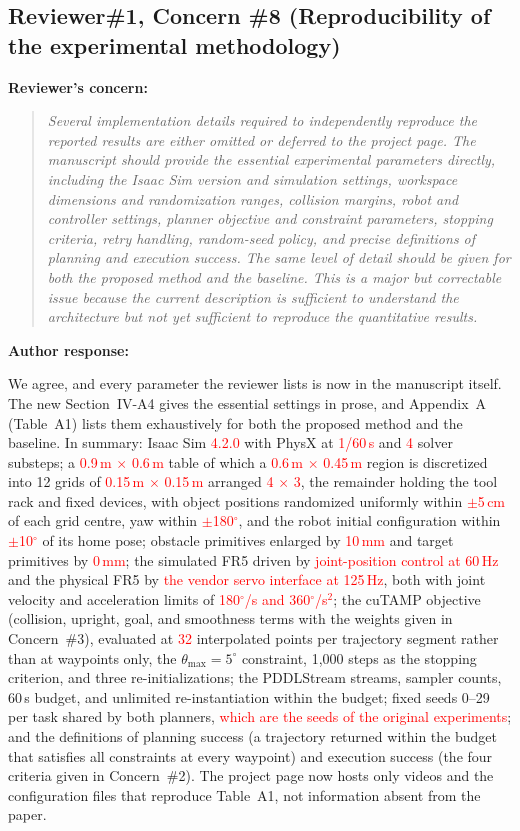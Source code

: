 \documentclass[11pt]{article}
\newcommand{\nd}[1]{\textcolor{red}{#1}}
\newif\ifshowstatus
\newcommand{\statusline}[2]{\ifshowstatus\par\noindent\textcolor{status#1}{\textbf{Status: \MakeUppercase{#1}.} #2}\par\smallskip\fi}
\newenvironment{concern}[3][pending]{\subsection*{\ifshowstatus\textcolor{status#1}{#2}\else#2\fi}\statusline{#1}{#3}\textbf{Reviewer's concern:}\begin{quote}\itshape}{\end{quote}}
\newenvironment{response}{\textbf{Author response:}\par\smallskip}{\par\medskip}
\begin{document}
\begin{concern}[pending]{Reviewer\#1, Concern \#8 (Reproducibility of the experimental methodology)}{Needs the configuration values in C (no experiment); Section IV-A4 and Appendix A can be drafted now with red placeholders.}
Several implementation details required to independently reproduce the reported results are either omitted or deferred to the project page.
The manuscript should provide the essential experimental parameters directly, including the Isaac Sim version and simulation settings, workspace dimensions and randomization ranges, collision margins, robot and controller settings, planner objective and constraint parameters, stopping criteria, retry handling, random-seed policy, and precise definitions of planning and execution success.
The same level of detail should be given for both the proposed method and the baseline.
This is a major but correctable issue because the current description is sufficient to understand the architecture but not yet sufficient to reproduce the quantitative results.
\end{concern}

\begin{response}
We agree, and every parameter the reviewer lists is now in the manuscript itself.
The new Section~IV-A4 gives the essential settings in prose, and Appendix~A (Table~A1) lists them exhaustively for both the proposed method and the baseline.
In summary:
Isaac Sim \nd{4.2.0} with PhysX at \nd{1/60\,s} and \nd{4} solver substeps;
a \nd{0.9\,m $\times$ 0.6\,m} table of which a \nd{0.6\,m $\times$ 0.45\,m} region is discretized into 12 grids of \nd{0.15\,m $\times$ 0.15\,m} arranged \nd{4 $\times$ 3}, the remainder holding the tool rack and fixed devices, with object positions randomized uniformly within \nd{$\pm$5\,cm} of each grid centre, yaw within \nd{$\pm$180$^\circ$}, and the robot initial configuration within \nd{$\pm$10$^\circ$} of its home pose;
obstacle primitives enlarged by \nd{10\,mm} and target primitives by \nd{0\,mm};
the simulated FR5 driven by \nd{joint-position control at 60\,Hz} and the physical FR5 by \nd{the vendor servo interface at 125\,Hz}, both with joint velocity and acceleration limits of \nd{180$^\circ$/s and 360$^\circ$/s$^2$};
the cuTAMP objective (collision, upright, goal, and smoothness terms with the weights given in Concern~\#3), evaluated at \nd{32} interpolated points per trajectory segment rather than at waypoints only, the $\theta_{\max}=5^\circ$ constraint, 1,000 steps as the stopping criterion, and three re-initializations;
the PDDLStream streams, sampler counts, 60\,s budget, and unlimited re-instantiation within the budget;
fixed seeds 0--29 per task shared by both planners, \nd{which are the seeds of the original experiments}; and
the definitions of planning success (a trajectory returned within the budget that satisfies all constraints at every waypoint) and execution success (the four criteria given in Concern~\#2).
The project page now hosts only videos and the configuration files that reproduce Table~A1, not information absent from the paper.
\end{response}
\end{document}

